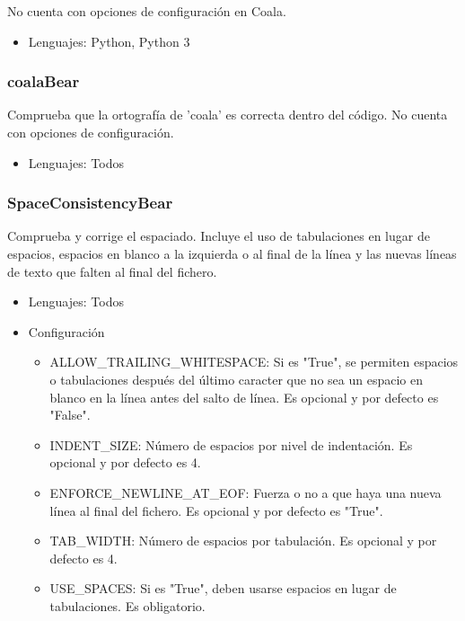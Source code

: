 \documentclass[a4paper, 12pt]{book}
\begin{document}
No cuenta con opciones de configuración en Coala.

\begin{itemize}
  \item Lenguajes: Python, Python 3
\end{itemize}

\subsubsection{coalaBear}
\label{sec:seccion1.2.16}
Comprueba que la ortografía de 'coala' es correcta dentro del código. No cuenta con opciones de configuración.

\begin{itemize}
  \item Lenguajes: Todos
\end{itemize}

\subsubsection{SpaceConsistencyBear}
\label{sec:seccion1.2.17}
Comprueba y corrige el espaciado. Incluye el uso de tabulaciones en lugar de espacios, espacios en blanco a la izquierda o al final de la línea y las nuevas líneas de texto que falten al final del fichero.

\begin{itemize}
  \item Lenguajes: Todos
  \item Configuración
    \begin{itemize}
          \item ALLOW\_TRAILING\_WHITESPACE: Si es "True", se permiten espacios o tabulaciones después del último caracter que no sea un espacio en blanco en la línea antes del salto de línea. Es opcional y por defecto es "False".
          \item INDENT\_SIZE: Número de espacios por nivel de indentación. Es opcional y por defecto es 4.
          \item ENFORCE\_NEWLINE\_AT\_EOF: Fuerza o no a que haya una nueva línea al final del fichero. Es opcional y por defecto es "True".
          \item TAB\_WIDTH: Número de espacios por tabulación. Es opcional y por defecto es 4.
          \item USE\_SPACES: Si es "True", deben usarse espacios en lugar de tabulaciones. Es obligatorio.
    \end{itemize}
\end{itemize}
\end{document}
